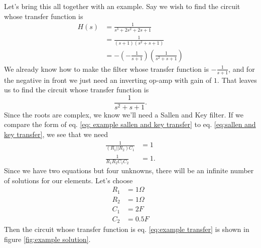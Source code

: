 \documentclass[nobib]{tufte-handout}
\begin{document}
Let's bring this all 
together with an example. 
Say we wish to find the circuit 
whose transfer function is 
\begin{align} \label{eq:example transfer}
    H(s) &= \frac{1}{s^3 + 2s^2 + 2s + 1} \\
    &= \frac{1}{(s+1)(s^2+s+1)} \\
    &= -\left( -\frac{1}{s+1} \right)\left( \frac{1}{s^2+s+1} \right)
\end{align}
We already know how to make
the filter whose transfer function 
is $-\frac{1}{s+1}$, and for 
the negative in front we 
just need an inverting 
op-amp with gain of $1$. 
That leaves us to find 
the circuit whose transfer 
function is 
\begin{equation} \label{eq:example sallen and key transfer}
    \frac{1}{s^2+s+1}.
\end{equation} 
Since the roots are complex, 
we know we'll need a Sallen 
and Key filter. If we compare 
the form of eq. \ref{eq: example sallen and key transfer}
to eq. \ref{eq:sallen and key transfer}, 
we see that we need 
\begin{align}
    \frac{1}{(R_1||R_2)C_1} &= 1 \\
    \frac{1}{R_1R_2C_1C_2} &= 1.
\end{align}
Since we have two equations but 
four unknowns, there will be 
an infinite number of 
solutions for our elements. 
Let's choose 
\begin{align}
    R_1 &= 1\Omega \\
    R_2 &= 1\Omega \\
    C_1 &= 2F \\
    C_2 &= 0.5F
\end{align}
Then the circuit whose transfer 
function is eq. \ref{eq:example transfer}
is shown in figure \ref{fig:example solution}.
\end{document}
